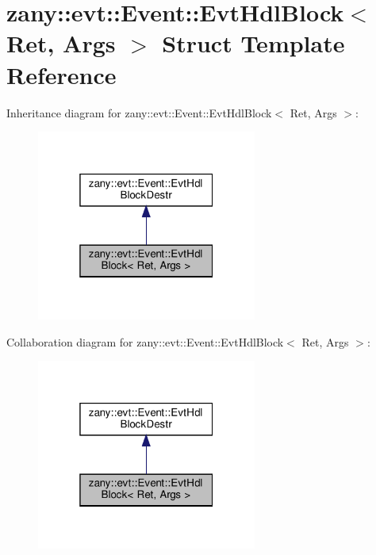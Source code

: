 \hypertarget{structzany_1_1evt_1_1_event_1_1_evt_hdl_block}{}\section{zany\+:\+:evt\+:\+:Event\+:\+:Evt\+Hdl\+Block$<$ Ret, Args $>$ Struct Template Reference}
\label{structzany_1_1evt_1_1_event_1_1_evt_hdl_block}


Inheritance diagram for zany\+:\+:evt\+:\+:Event\+:\+:Evt\+Hdl\+Block$<$ Ret, Args $>$\+:
\nopagebreak
\begin{figure}[H]
\begin{center}
\leavevmode
\includegraphics[width=205pt]{structzany_1_1evt_1_1_event_1_1_evt_hdl_block__inherit__graph}
\end{center}
\end{figure}


Collaboration diagram for zany\+:\+:evt\+:\+:Event\+:\+:Evt\+Hdl\+Block$<$ Ret, Args $>$\+:
\nopagebreak
\begin{figure}[H]
\begin{center}
\leavevmode
\includegraphics[width=205pt]{structzany_1_1evt_1_1_event_1_1_evt_hdl_block__coll__graph}
\end{center}
\end{figure}
